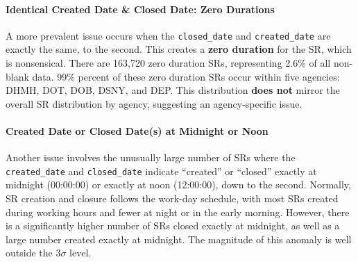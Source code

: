 \documentclass[linenumber]{jdsart}
\begin{document}
\paragraph{Identical Created Date \& Closed Date: Zero Durations}
A more prevalent issue occurs when the \texttt{closed\_date} and 
\texttt{created\_date} are exactly the same, to the second. This 
creates a \textbf{zero duration} for the SR, which is nonsensical. There 
are 163,720 zero duration SRs, representing 2.6\% of all non\mbox{-}blank data. 
99\% percent of these zero duration SRs occur within five agencies:
DHMH, DOT, DOB, DSNY, and DEP. This distribution \textbf{does not} 
mirror the overall SR distribution by agency, suggesting 
an agency\mbox{-}specific issue.
	
\paragraph{Created Date or Closed Date(s) at Midnight or Noon}
Another issue involves the unusually large number of 
SRs where the \texttt{created\_date} and \texttt{closed\_date} 
indicate ``created'' or ``closed'' exactly at midnight (00:00:00) or 
exactly at noon (12:00:00), down to the second. Normally, 
SR creation and closure follows the work\mbox{-}day schedule, 
with most SRs created during working hours and 
fewer at night or in the early morning. However, there is a 
significantly higher number of SRs closed exactly at midnight, 
as well as a large number created exactly at midnight. The magnitude
of this anomaly is well outside the 3$\sigma$ level. 
\end{document}
